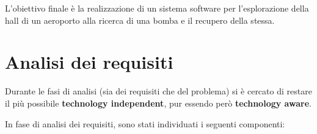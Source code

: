 \documentclass{llncs}
\newcommand{\labelsec}[1]{\label{sec:#1}}
\begin{document}
L'obiettivo finale è la realizzazione di un sistema software per l'esplorazione della hall di un aeroporto alla ricerca di una bomba e il recupero della stessa.





\section{Analisi dei requisiti}\labelsec{req_analysis}

Durante le fasi di analisi (sia dei requisiti che del problema) si è cercato di restare il più possibile \textbf{technology independent}, pur essendo però \textbf{technology aware}.

In fase di analisi dei requisiti, sono stati individuati i seguenti componenti:
\end{document}
